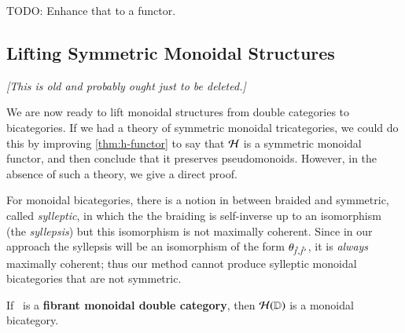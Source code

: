 TODO: Enhance that to a functor.

\subsection{Lifting Symmetric Monoidal Structures}

\textit{[This is old and probably ought just to be deleted.]}

We are now ready to lift monoidal structures from double categories to
bicategories.  If we had a theory of symmetric monoidal tricategories,
we could do this by improving \autoref{thm:h-functor} to say that
$\mathcal{H}$ is a symmetric monoidal functor, and then conclude that it
preserves pseudomonoids.  However, in the absence of such a theory, we
give a direct proof.

\begin{rmk}\label{rmk:sym}
  For monoidal bicategories, there is a notion in between braided and
  symmetric, called \emph{sylleptic}, in which the the braiding is
  self-inverse up to an isomorphism (the \emph{syllepsis}) but this
  isomorphism is not maximally coherent.  Since in our approach the
  syllepsis will be an isomorphism of the form
  $\theta_{\hat{f},\hat{f}'}$, it is \emph{always} maximally coherent;
  thus our method cannot produce sylleptic monoidal bicategories that
  are not symmetric.
\end{rmk}

\begin{lem}\label{thm:mon11-monbi}
  If \lD\ is a {\bf fibrant monoidal double category}, then $\mathcal{H}(\mathbb{D})$ is a
  monoidal bicategory.  
\end{lem}


